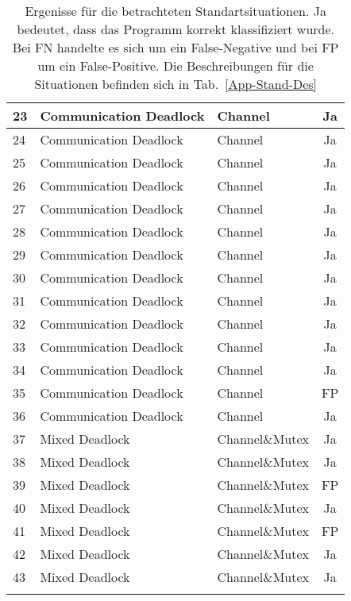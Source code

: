 \begin{longtable}[h]{|l|l|l|c|}
  23 & Communication Deadlock & Channel & Ja \\ \hline
  24 & Communication Deadlock & Channel & Ja \\ \hline
  25 & Communication Deadlock & Channel & Ja \\ \hline
  26 & Communication Deadlock & Channel & Ja \\ \hline
  27 & Communication Deadlock & Channel & Ja \\ \hline
  28 & Communication Deadlock & Channel & Ja \\ \hline
  29 & Communication Deadlock & Channel & Ja \\ \hline
  30 & Communication Deadlock & Channel & Ja \\ \hline
  31 & Communication Deadlock & Channel & Ja \\ \hline
  32 & Communication Deadlock & Channel & Ja \\ \hline
  33 & Communication Deadlock & Channel & Ja \\ \hline
  34 & Communication Deadlock & Channel & Ja \\ \hline
  35 & Communication Deadlock & Channel & FP \\ \hline
  36 & Communication Deadlock & Channel & Ja \\ \hline
  37 & Mixed Deadlock & Channel\&Mutex & Ja \\ \hline
  38 & Mixed Deadlock & Channel\&Mutex & Ja \\ \hline
  39 & Mixed Deadlock & Channel\&Mutex & FP \\ \hline
  40 & Mixed Deadlock & Channel\&Mutex & Ja \\ \hline
  41 & Mixed Deadlock & Channel\&Mutex & FP \\ \hline
  42 & Mixed Deadlock & Channel\&Mutex & Ja \\ \hline
  43 & Mixed Deadlock & Channel\&Mutex & Ja \\ \hline
  \caption{Ergenisse für die betrachteten Standartsituationen. Ja bedeutet, 
  dass das Programm korrekt klassifiziert wurde. Bei FN handelte es sich 
  um ein False-Negative und bei FP um ein False-Positive. Die Beschreibungen
  für die Situationen befinden sich in Tab.~\ref{App-Stand-Des}}
  \label{App-Stand-Res}
\end{longtable}



